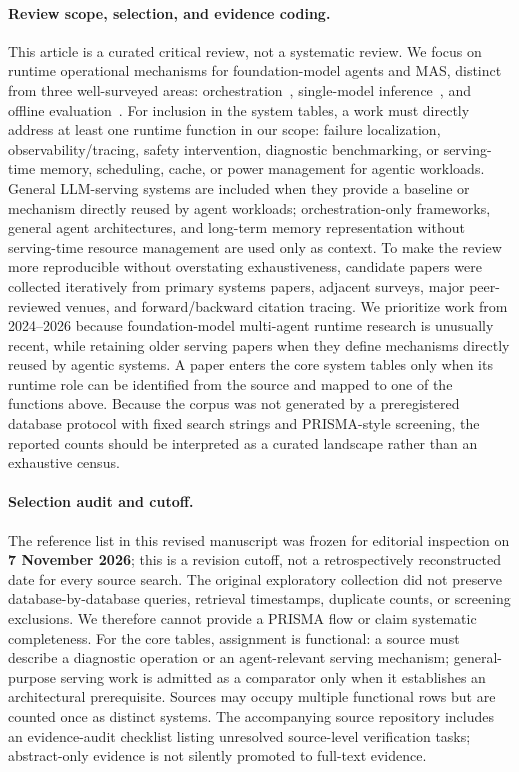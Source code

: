 \paragraph*{Review scope, selection, and evidence coding.} This article is a curated critical review, not a systematic review. We focus on runtime operational mechanisms for foundation-model agents and MAS, distinct from three well-surveyed areas: orchestration~\cite{zhu2026orchestration}, single-model inference~\cite{kwon2023}, and offline evaluation~\cite{evalbenchmark2025}. For inclusion in the system tables, a work must directly address at least one runtime function in our scope: failure localization, observability/tracing, safety intervention, diagnostic benchmarking, or serving-time memory, scheduling, cache, or power management for agentic workloads. General LLM-serving systems are included when they provide a baseline or mechanism directly reused by agent workloads; orchestration-only frameworks, general agent architectures, and long-term memory representation without serving-time resource management are used only as context. To make the review more reproducible without overstating exhaustiveness, candidate papers were collected iteratively from primary systems papers, adjacent surveys, major peer-reviewed venues, and forward/backward citation tracing. We prioritize work from 2024--2026 because foundation-model multi-agent runtime research is unusually recent, while retaining older serving papers when they define mechanisms directly reused by agentic systems. A paper enters the core system tables only when its runtime role can be identified from the source and mapped to one of the functions above. Because the corpus was not generated by a preregistered database protocol with fixed search strings and PRISMA-style screening, the reported counts should be interpreted as a curated landscape rather than an exhaustive census.

\paragraph*{Selection audit and cutoff.} The reference list in this revised manuscript was frozen for editorial inspection on \textbf{7 November 2026}; this is a revision cutoff, not a retrospectively reconstructed date for every source search. The original exploratory collection did not preserve database-by-database queries, retrieval timestamps, duplicate counts, or screening exclusions. We therefore cannot provide a PRISMA flow or claim systematic completeness. For the core tables, assignment is functional: a source must describe a diagnostic operation or an agent-relevant serving mechanism; general-purpose serving work is admitted as a comparator only when it establishes an architectural prerequisite. Sources may occupy multiple functional rows but are counted once as distinct systems. The accompanying source repository includes an evidence-audit checklist listing unresolved source-level verification tasks; abstract-only evidence is not silently promoted to full-text evidence.

